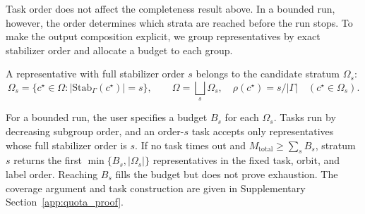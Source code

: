 \documentclass[a5paper, 10pt]{article}
\begin{document}
Task order does not affect the completeness result above. In a bounded run, however, the order determines which strata are reached before the run stops. To make the output composition explicit, we group representatives by exact stabilizer order and allocate a budget to each group.

A representative with full stabilizer order $s$ belongs to the candidate stratum $\Omega_s$:%
\begin{equation}
\Omega_s=\{c^\star\in\Omega:|\mathrm{Stab}_{\Gamma}(c^\star)|=s\},
\qquad \Omega=\bigsqcup_s\Omega_s,\quad
\rho(c^\star)=s/|\Gamma|\quad(c^\star\in\Omega_s).
\label{eq:rho_strata}
\end{equation}

For a bounded run, the user specifies a budget $B_s$ for each $\Omega_s$. Tasks run by decreasing subgroup order, and an order-$s$ task accepts only representatives whose full stabilizer order is $s$. If no task times out and $M_{\mathrm{total}}\ge\sum_sB_s$, stratum $s$ returns the first $\min\{B_s,|\Omega_s|\}$ representatives in the fixed task, orbit, and label order. Reaching $B_s$ fills the budget but does not prove exhaustion. The coverage argument and task construction are given in Supplementary Section~\ref{app:quota_proof}.
\end{document}
